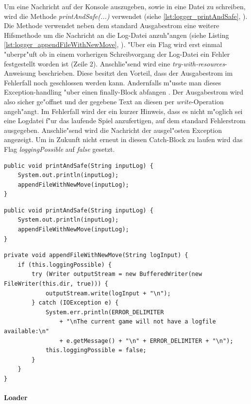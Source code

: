 Um eine Nachricht auf der Konsole auszugeben, sowie in eine Datei zu schreiben, wird die Methode \emph{printAndSafe(...)} verwendet (siehe \ref{lst:logger_printAndSafe}, ). Die Methode verwendet neben dem standard Ausgabestrom eine weitere Hifsmethode um die Nachricht an die Log-Datei anzuh"angen (siehe Listing \ref{lst:logger_appendFileWithNewMove}, ). "Uber ein Flag wird erst einmal "uberpr"uft ob in einem vorherigen Schreibvorgang der Log-Datei ein Fehler festgestellt worden ist (Zeile 2). Anschlie"send wird eine \emph{try-with-resources}-Anweisung beschrieben. Diese besitzt den Vorteil, dass der Ausgabestrom im Fehlerfall noch geschlossen werden kann. Andernfalls m"usste man dieses Exception-handling "uber einen finally-Block abfangen
\cite{try-with-resources}
. Der Ausgabestrom wird also sicher ge"offnet und der gegebene Text an diesen per \emph{write}-Operation angeh"angt. Im Fehlerfall wird der ein kurzer Hinweis, dass es nicht m"oglich sei eine Logdatei f"ur das laufende Spiel anzufertigen, auf dem standard Fehlerstrom ausgegeben. Anschlie"send wird die Nachricht der ausgel"osten Exception angezeigt. Um in Zukunft nicht erneut in diesen Catch-Block zu laufen wird das Flag \emph{loggingPossible} auf \emph{false} gesetzt. 

\begin{lstlisting}[float,style=CodeHighlighting,caption=Logger - printAndSafe,label=lst:logger_printAndSafe]
public void printAndSafe(String inputLog) {
    System.out.println(inputLog);
    appendFileWithNewMove(inputLog);
}
\end{lstlisting}

\begin{lstlisting}[float,style=CodeHighlighting,caption=Logger - printAndSafe,label=lst:logger_printAndSafe]
public void printAndSafe(String inputLog) {
    System.out.println(inputLog);
    appendFileWithNewMove(inputLog);
}
\end{lstlisting}

\begin{lstlisting}[float,style=CodeHighlighting,caption=Logger - appendFileWithNewMove,label=lst:logger_appendFileWithNewMove]
private void appendFileWithNewMove(String logInput) {
    if (this.loggingPossible) {
        try (Writer outputStream = new BufferedWriter(new FileWriter(this.dir, true))) {
            outputStream.write(logInput + "\n");
        } catch (IOException e) {
            System.err.println(ERROR_DELIMITER 
            	+ "\nThe current game will not have a logfile available:\n"
                + e.getMessage() + "\n" + ERROR_DELIMITER + "\n");
            this.loggingPossible = false;
        }
    }
}
\end{lstlisting}


\paragraph{Loader}
\label{par:loader}



